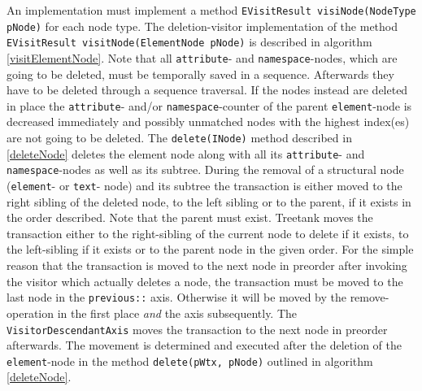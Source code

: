 An implementation must implement a method \texttt{EVisitResult visiNode(NodeType pNode)} for each node type. The deletion-visitor implementation of the method \texttt{EVisitResult visitNode(ElementNode pNode)} is described in algorithm \ref{visitElementNode}. Note that all \texttt{attribute}- and \texttt{namespace}-nodes, which are going to be deleted, must be temporally saved in a sequence. Afterwards they have to be deleted through a sequence traversal. If the nodes instead are deleted in place the \texttt{attribute}- and/or \texttt{namespace}-counter of the parent \texttt{element}-node is decreased immediately and possibly unmatched nodes with the highest index(es) are not going to be deleted. The \texttt{delete(INode)} method described in \ref{deleteNode} deletes the element node along with all its \texttt{attribute}- and \texttt{namespace}-nodes as well as its subtree. During the removal of a structural node (\texttt{element}- or \texttt{text}- node) and its subtree the transaction is either moved to the right sibling of the deleted node, to the left sibling or to the parent, if it exists in the order described. Note that the parent must exist. Treetank moves the transaction either to the right-sibling of the current node to delete if it exists, to the left-sibling if it exists or to the parent node in the given order. For the simple reason that the  transaction is moved to the next node in preorder after invoking the visitor which actually deletes a node, the transaction must be moved to the last node in the \texttt{previous::} axis. Otherwise it will be moved by the remove-operation in the first place \emph{and} the axis subsequently. The \texttt{VisitorDescendantAxis} moves the transaction to the next node in preorder afterwards. The movement is determined and executed after the deletion of the \texttt{element}-node in the method \texttt{delete(pWtx, pNode)} outlined in algorithm \ref{deleteNode}.

